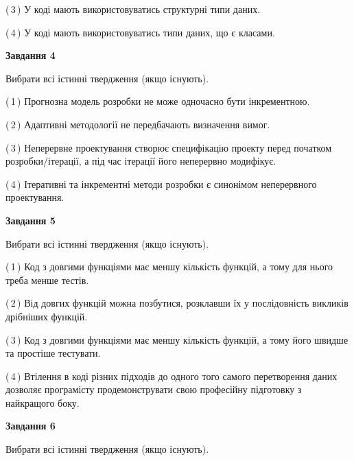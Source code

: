 \documentclass[10pt, ukrainian]{article}
\begin{document}
{\begin {large}
(\,3\,) У коді мають використовуватись структурні типи даних. %



(\,4\,) У коді мають використовуватись типи даних, що є класами. %


{\begin {center}\textbf{Завдання 4}\end {center}}\par
Вибрати всі істинні твердження (якщо існують).\par
\vspace{2mm}



(\,1\,) Прогнозна модель розробки не може одночасно бути інкрементною. %



(\,2\,) Адаптивні методології не передбачають визначення вимог. %



(\,3\,) Неперервне проектування створює специфікацію проекту перед початком розробки/ітерації, а під час ітерації його неперервно модифікує.%



(\,4\,) Ітеративні та інкрементні методи розробки є синонімом неперервного проектування. %


{\begin {center}\textbf{Завдання 5}\end {center}}\par
Вибрати всі істинні твердження (якщо існують).\par
\vspace{2mm}



(\,1\,) Код з довгими функціями має меншу кількість функцій, а тому для нього треба менше тестів. %



(\,2\,) Від довгих функцій можна позбутися, розклавши їх у послідовність викликів дрібніших функцій. %



(\,3\,) Код з довгими функціями має меншу кількість функцій, а тому його швидше та простіше тестувати. %



(\,4\,) Втілення в коді різних підходів до одного того самого перетворення даних дозволяє програмісту продемонструвати свою професійну підготовку з найкращого боку. %

\newpage

{\begin {center}\textbf{Завдання 6}\end {center}}\par
Вибрати всі істинні твердження (якщо існують).\par
\vspace{2mm}




\end{large}}
\end{document}
